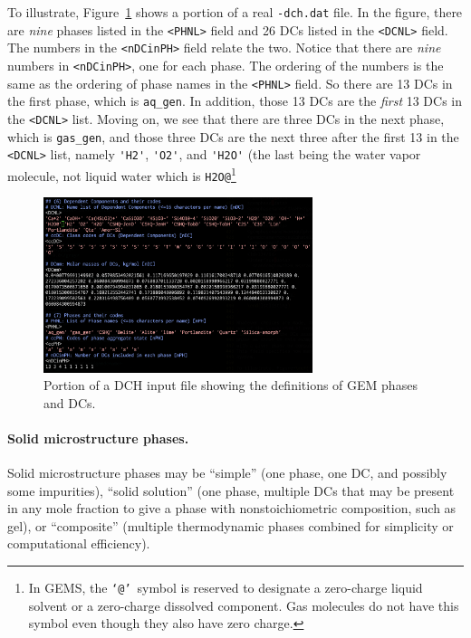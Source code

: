 \documentclass{article}
\begin{document}
{To illustrate, Figure~\ref{fig:dchfile} shows a portion of a real \verb!-dch.dat! file.
In the figure, there are \textit{nine} phases listed in the \verb!<PHNL>! field and
26 DCs listed in the \verb!<DCNL>! field.  The numbers in the \verb!<nDCinPH>! field
relate the two.  Notice that there are \textit{nine} numbers in \verb!<nDCinPH>!, one
for each phase. The ordering of the numbers is the same as the ordering of phase
names in the \verb!<PHNL>! field.  So there are 13 DCs in the first phase, which
is \verb!aq_gen!.  In addition, those 13 DCs are the \textit{first} 13 DCs in the
\verb!<DCNL>! list.  Moving on, we see that there are three DCs in the next phase, which
is \verb!gas_gen!, and those three DCs are the next three after the first 13 in the
\verb!<DCNL>! list, namely \verb!'H2'!, \verb!'O2'!, and \verb!'H2O'! (the last being
the water vapor molecule, not liquid water which is \verb!H2O@!\footnote{In GEMS, the
	\makeatletter\texttt{`@'}\makeatother\ symbol is reserved to designate
	a zero-charge liquid solvent or
	a zero-charge dissolved component.  Gas molecules do not have this symbol even though
	they also have zero charge.}

\begin{figure}
	\centering\includegraphics[width=0.7\textwidth]{Figures/dchfile.png}
	\caption{\label{fig:dchfile} Portion of a DCH input file showing the definitions
		of GEM phases and DCs.}
\end{figure}

\paragraph{Solid microstructure phases.} Solid microstructure
phases may be ``simple'' (one phase, one DC, and possibly
some impurities), ``solid solution'' (one phase, multiple DCs
that may be present in any mole fraction to give a phase
with nonstoichiometric composition, such as  gel),
or ``composite'' (multiple thermodynamic phases combined for
simplicity or computational efficiency).

}
\end{document}
